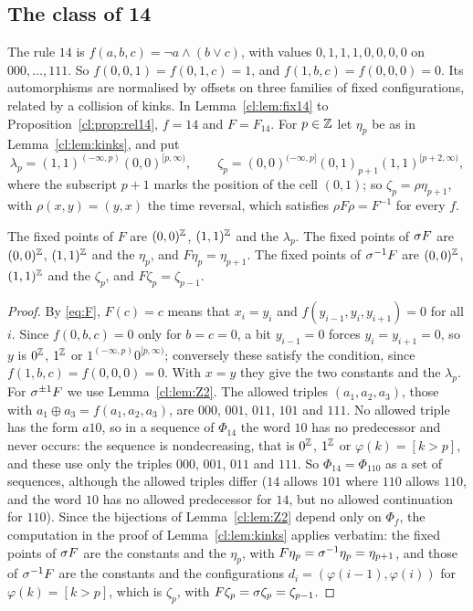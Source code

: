 \subsection{The class of 14}\label{cl:sec:14}

The rule $14$ is $f(a,b,c)=\neg a\wedge(b\vee c)$, with values $0,1,1,1,0,0,0,0$ on $000,\dots,111$. So $f(0,0,1)=f(0,1,c)=1$, and $f(1,b,c)=f(0,0,0)=0$. Its automorphisms are normalised by offsets on three families of fixed configurations, related by a collision of kinks. In Lemma~\ref{cl:lem:fix14} to Proposition~\ref{cl:prop:rel14}, $f=14$ and $F=F_{14}$. For $p\in\mathbb{Z}$ let $\eta_p$ be as in Lemma~\ref{cl:lem:kinks}, and put
\[
\lambda_p=(1,1)^{(-\infty,p)}(0,0)^{[p,\infty)},\qquad \zeta_p=(0,0)^{(-\infty,p]}(0,1)_{p+1}(1,1)^{[p+2,\infty)},
\]
where the subscript $p+1$ marks the position of the cell $(0,1)$; so $\zeta_p=\rho\eta_{p+1}$, with $\rho(x,y)=(y,x)$ the time reversal, which satisfies $\rho F\rho=F^{-1}$ for every $f$.

\begin{lemma}\label{cl:lem:fix14}
The fixed points of $F$ are $(0,0)^{\mathbb{Z}}$, $(1,1)^{\mathbb{Z}}$ and the $\lambda_p$. The fixed points of $\sigma F$ are $(0,0)^{\mathbb{Z}}$, $(1,1)^{\mathbb{Z}}$ and the $\eta_p$, and $F\eta_p=\eta_{p+1}$. The fixed points of $\sigma^{-1}F$ are $(0,0)^{\mathbb{Z}}$, $(1,1)^{\mathbb{Z}}$ and the $\zeta_p$, and $F\zeta_p=\zeta_{p-1}$.
\end{lemma}

\begin{proof}
By \eqref{eq:F}, $F(c)=c$ means that $x_i=y_i$ and $f(y_{i-1},y_i,y_{i+1})=0$ for all $i$. Since $f(0,b,c)=0$ only for $b=c=0$, a bit $y_{i-1}=0$ forces $y_i=y_{i+1}=0$, so $y$ is $0^{\mathbb{Z}}$, $1^{\mathbb{Z}}$ or $1^{(-\infty,p)}0^{[p,\infty)}$; conversely these satisfy the condition, since $f(1,b,c)=f(0,0,0)=0$. With $x=y$ they give the two constants and the $\lambda_p$. For $\sigma^{\pm1}F$ we use Lemma~\ref{cl:lem:Z2}. The allowed triples $(a_1,a_2,a_3)$, those with $a_1\oplus a_3=f(a_1,a_2,a_3)$, are $000$, $001$, $011$, $101$ and $111$. No allowed triple has the form $a10$, so in a sequence of $\Phi_{14}$ the word $10$ has no predecessor and never occurs: the sequence is nondecreasing, that is $0^{\mathbb{Z}}$, $1^{\mathbb{Z}}$ or $\varphi(k)=[k>p]$, and these use only the triples $000$, $001$, $011$ and $111$. So $\Phi_{14}=\Phi_{110}$ as a set of sequences, although the allowed triples differ ($14$ allows $101$ where $110$ allows $110$, and the word $10$ has no allowed predecessor for $14$, but no allowed continuation for $110$). Since the bijections of Lemma~\ref{cl:lem:Z2} depend only on $\Phi_f$, the computation in the proof of Lemma~\ref{cl:lem:kinks} applies verbatim: the fixed points of $\sigma F$ are the constants and the $\eta_p$, with $F\eta_p=\sigma^{-1}\eta_p=\eta_{p+1}$, and those of $\sigma^{-1}F$ are the constants and the configurations $d_i=(\varphi(i-1),\varphi(i))$ for $\varphi(k)=[k>p]$, which is $\zeta_p$, with $F\zeta_p=\sigma\zeta_p=\zeta_{p-1}$.
\end{proof}


